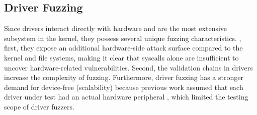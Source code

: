 \subsection{Driver Fuzzing}
Since drivers interact directly with hardware and are the most extensive subsystem in the kernel, they possess several unique fuzzing characteristics. , first, they expose an additional hardware-side attack surface compared to the kernel and file systems, making it clear that syscalls alone are insufficient to uncover hardware-related vulnerabilities. Second, the validation chains in drivers increase the complexity of fuzzing. Furthermore, driver fuzzing has a stronger demand for device-free (\ie scalability) because previous work assumed that each driver under test had an actual hardware peripheral \cite{Song2019PeriScopeAE,Talebi2018CharmFD}, which limited the testing scope of driver fuzzers.


